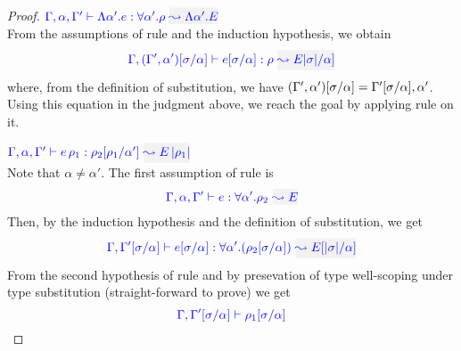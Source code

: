 \begin{proof}
\item[\fbox{\rref{Ty-TAbs}}]\quad$\wte{\tenv,\alpha,\tenv'}{\Abs{\alpha'}{e}}{\tall{\alpha'}{\rulet}}{\Abs{\alpha'}{E}}$\\
From the assumptions of rule  and the induction hypothesis, we obtain
\begin{equation*}
\wte{\tenv,(\tenv',\alpha')[\suty/\alpha]}{e[\suty/\alpha]}{\rulet}{E\etrans{\suty}/\alpha]}
\end{equation*}
where, from the definition of substitution, we have
$(\Gamma',\alpha')[\sigma/\alpha] = \Gamma'[\sigma/\alpha],\alpha'$. Using this equation in the judgment above, we reach the goal by applying rule  on it.\\

\item[\fbox{\rref{Ty-TApp}}]\quad$\wte{\tenv,\alpha,\tenv'}{\mmapp{e}{\rulet_1}}{\rulet_2[\rulet_1/\alpha']}{\mmapp{E}{\etrans{\rulet_1}}}$\\
Note that $\alpha \neq \alpha'$.
The first assumption of rule  is
\begin{equation*}
\wte{\tenv,\alpha,\tenv'}{e}{\tall{\alpha'}{\rulet_2}}{E}
\end{equation*}
Then, by the induction hypothesis and the definition of substitution, we get
\begin{equation*}
\wte{\tenv,\tenv'[\suty/\alpha]}{e[\suty/\alpha]}{\tall{\alpha'}{(\rulet_2[\suty/\alpha])}}{E[\etrans{\suty}/\alpha]}
\end{equation*}
From the second hypothesis of rule  and by presevation of type well-scoping
under type substitution (straight-forward to prove) we get
\begin{equation*}
{\color{blue} \Gamma,\Gamma'[\sigma/\alpha] \vdash\rho_1[\sigma/\alpha]}
\end{equation*}


\end{proof}
